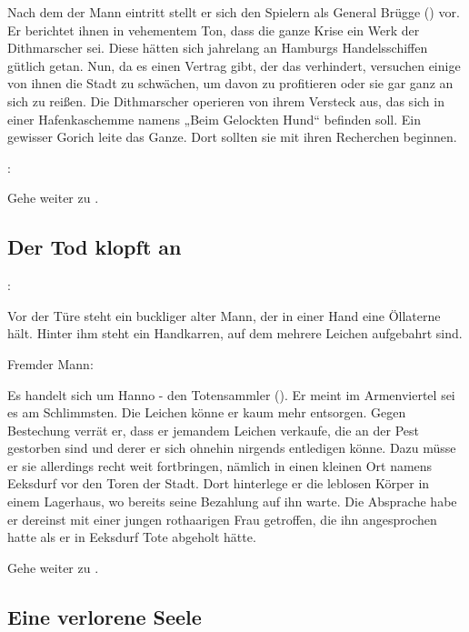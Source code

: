 Nach dem der Mann eintritt stellt er sich den Spielern als General Brügge (\blue{\ref{Brügge}}) vor. Er berichtet ihnen in vehementem Ton, dass die ganze Krise ein Werk der Dithmarscher sei. Diese hätten sich jahrelang an Hamburgs Handelsschiffen gütlich getan. Nun, da es einen Vertrag gibt, der das verhindert, versuchen einige von ihnen die Stadt zu schwächen, um davon zu profitieren oder sie gar ganz an sich zu reißen. Die Dithmarscher operieren von ihrem Versteck aus, das sich in einer Hafenkaschemme namens „Beim Gelockten Hund“ befinden soll. Ein gewisser Gorich leite das Ganze. Dort sollten sie mit ihren Recherchen beginnen.


:


Gehe weiter zu \blue{\ref{weiter}}.

\subsection{Der Tod klopft an}
\label{tot}

:

Vor der Türe steht ein buckliger alter Mann, der in einer Hand eine Öllaterne hält. Hinter ihm steht ein Handkarren, auf dem mehrere Leichen aufgebahrt sind.

Fremder Mann:

Es handelt sich um Hanno - den Totensammler (\blue{\ref{Hanno}}). Er meint im Armenviertel sei es am Schlimmsten. Die Leichen könne er kaum mehr entsorgen. Gegen Bestechung verrät er, dass er jemandem Leichen verkaufe, die an der Pest gestorben sind und derer er sich ohnehin nirgends entledigen könne. Dazu müsse er sie allerdings recht weit fortbringen, nämlich in einen kleinen Ort namens Eeksdurf vor den Toren der Stadt. Dort hinterlege er die leblosen Körper in einem Lagerhaus, wo bereits seine Bezahlung auf ihn warte. Die Absprache habe er dereinst mit einer jungen rothaarigen Frau getroffen, die ihn angesprochen hatte als er in Eeksdurf Tote abgeholt hätte.

Gehe weiter zu \blue{\ref{weiter}}.

\subsection{Eine verlorene Seele}
\label{kind}

